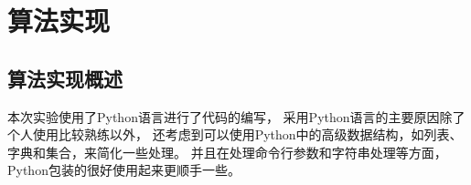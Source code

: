 \documentclass{ctexart}
\let\stdsection\section
\renewcommand\section{\newpage\stdsection}
\begin{document}
% 

\section{算法实现}

\subsection{算法实现概述}

本次实验使用了Python语言进行了代码的编写，
采用Python语言的主要原因除了个人使用比较熟练以外，
还考虑到可以使用Python中的高级数据结构，如列表、字典和集合，来简化一些处理。
并且在处理命令行参数和字符串处理等方面，Python包装的很好使用起来更顺手一些。
\end{document}
